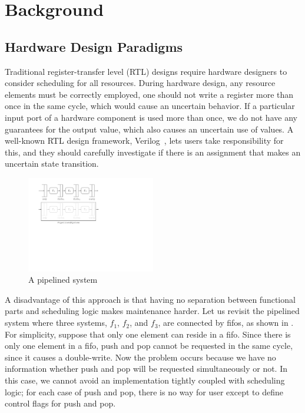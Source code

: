 \chapter{Background}
\label{chap:backgrounds}

\section{Hardware Design Paradigms}
\label{sec:design-paradigm}

Traditional register-transfer level (RTL) designs require hardware
designers to consider scheduling for all resources. During hardware
design, any resource elements must be correctly employed, \eg{} one
should not write a register more than once in the same cycle, which
would cause an uncertain behavior. If a particular input port of a
hardware component is used more than once, we do not have any
guarantees for the output value, which also causes an uncertain use of
values. A well-known RTL design framework, Verilog~\cite{verilog},
lets users take responsibility for this, and they should carefully
investigate if there is an assignment that makes an uncertain state
transition.
\begin{figure}[h]
  \centering
  \includegraphics[width=0.5\textwidth]{figures/pipeline.pdf}
  \caption{A pipelined system}
  \label{fig-pipelined-system}
\end{figure}

A disadvantage of this approach is that having no separation between
functional parts and scheduling logic makes maintenance harder. Let us
revisit the pipelined system where three systems, $f_1$, $f_2$, and
$f_3$, are connected by fifos, as shown in
. For simplicity, suppose that only one
element can reside in a fifo. Since there is only one element in a
fifo, push and pop cannot be requested in the same cycle, since it
causes a double-write. Now the problem occurs because we have no
information whether push and pop will be requested simultaneously or
not. In this case, we cannot avoid an implementation tightly coupled
with scheduling logic; for each case of push and pop, there is no way
for user except to define control flags for push and pop.

